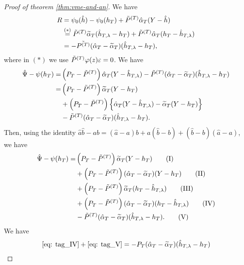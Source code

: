 \documentclass[11pt]{article}
\begin{document}
\begin{proof}[Proof of theorem \ref{thm:vme-and-an}]
We have
\begin{align*}
    R &= \psi_0(\hat{h}) - \psi_0(h_T) + \Tilde{P}^{(T)}\hat{\alpha}_T(Y - \hat{h})\\
    &\stackrel{(\ast)}{=} \Tilde{P}^{(T)} \widetilde \alpha_T (\hat{h}_{T,\lambda} - h_T) + \Tilde{P}^{(T)}\hat{\alpha}_T(h_T - \hat{h}_{T,\lambda})\\
    &= - \Tilde{P^{(T)}}(\hat{\alpha}_T - \widetilde \alpha_T)(\hat{h}_{T,\lambda} - h_T),
\end{align*}
where in $(\ast)$ we use $\Tilde{P}^{(T)}\varphi(z)\varepsilon = 0$. We have
\begin{align*}
    \hat{\Psi} - \psi(h_T) =& \left(P_{T} - \Tilde{P}^{(T)}\right)\hat{\alpha}_T(Y - \hat{h}_{T,\lambda}) - \Tilde{P}^{(T)}(\hat{\alpha}_T - \widetilde \alpha_T)(\hat{h}_{T,\lambda} - h_T)\\
    =& \left(P_T - \Tilde{P}^{(T)}\right)\widetilde \alpha_T(Y - h_T)\\
    &+ \left(P_{T} - \Tilde{P}^{(T)}\right)\left\{\hat{\alpha}_T(Y - \hat{h}_{T,\lambda}) - \widetilde \alpha_T (Y - h_T)\right\}\\
    &- \Tilde{P}^{(T)}(\hat{\alpha}_T - \widetilde \alpha_T)(\hat{h}_{T,\lambda} - h_T).
\end{align*}
Then, using the identity $\hat{a}\hat{b} - ab = (\hat{a} - a)b + a(\hat{b} - b) + (\hat{b} - b)(\hat{a} - a)$, we have
\begin{align}
    \hat{\Psi} - \psi(h_T) =& \left(P_T - \Tilde{P}^{(T)}\right)\widetilde \alpha_T(Y - h_T) \tag{I}\label{eq: tag_I}\\
    &+ \left(P_T - \Tilde{P}^{(T)}\right)(\hat{\alpha}_T - \widetilde \alpha_T)(Y - h_T) \tag{II} \label{eq: tag_II}\\
    &+ \left(P_T - \Tilde{P}^{(T)}\right)\widetilde \alpha_T (h_T - \hat{h}_{T,\lambda}) \tag{III} \label{eq: tag_III}\\
    &+ \left(P_T - \Tilde{P}^{(T)}\right)(\hat{\alpha}_T - \widetilde \alpha_T)(h_T - \hat{h}_{T,\lambda}) \tag{IV} \label{eq: tag_IV}\\
    &- \Tilde{P}^{(T)}(\hat{\alpha}_T - \widetilde \alpha_T)(\hat{h}_{T,\lambda} - h_T).\tag{V}  \label{eq: tag_V}
\end{align}
We have 
\begin{align*}
    \eqref{eq: tag_IV} + \eqref{eq: tag_V} &= - P_T(\hat{\alpha}_T - \widetilde \alpha_T)(\hat{h}_{T,\lambda} - h_T)\\

\end{align*}
\end{proof}
\end{document}
